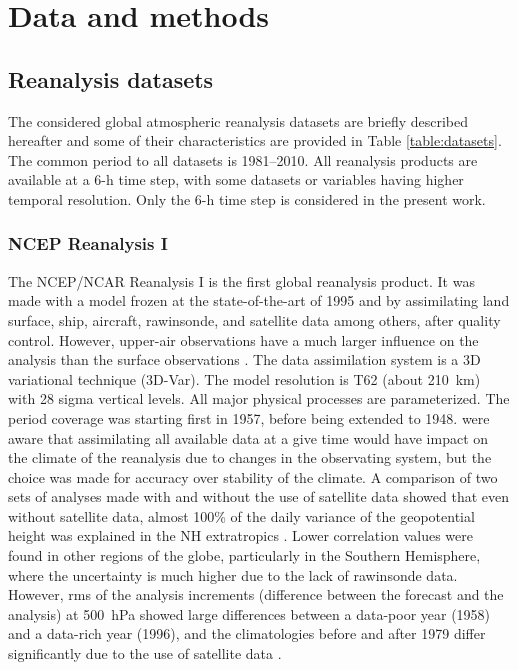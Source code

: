 \documentclass{ametsoc}
\begin{document}
\section{Data and methods}
\label{sec:data}

\subsection{Reanalysis datasets}

The considered global atmospheric reanalysis datasets are briefly described hereafter and some of their characteristics are provided in Table \ref{table:datasets}. The common period to all datasets is 1981--2010. All reanalysis products are available at a 6-h time step, with some datasets or variables having higher temporal resolution. Only the 6-h time step is considered in the present work.

\subsubsection{NCEP Reanalysis I}

The NCEP/NCAR Reanalysis I \citep[NR-1,][]{Kalnay1996, Kistler2001} is the first global reanalysis product. It was made with a model frozen at the state-of-the-art of 1995 and by assimilating land surface, ship, aircraft, rawinsonde, and satellite data among others, after quality control. However, upper-air observations have a much larger influence on the analysis than the surface observations \citep{Kistler2001}. The data assimilation system is a 3D variational technique (3D-Var). The model resolution is T62 (about 210~km) with 28 sigma vertical levels. All major physical processes are parameterized. The period coverage was starting first in 1957, before being extended to 1948. \citet{Kalnay1996} were aware that assimilating all available data at a give time would have impact on the climate of the reanalysis due to changes in the observating system, but the choice was made for accuracy over stability of the climate. A comparison of two sets of analyses made with and without the use of satellite data showed that even without satellite data, almost 100\% of the daily variance of the geopotential height was explained in the NH extratropics \citep{Kalnay1996}. Lower correlation values were found in other regions of the globe, particularly in the Southern Hemisphere, where the uncertainty is much higher due to the lack of rawinsonde data. However, rms of the analysis increments (difference between the forecast and the analysis) at 500~hPa showed large differences between a data-poor year (1958) and a data-rich year (1996), and the climatologies before and after 1979 differ significantly due to the use of satellite data \citep{Kistler2001}.
\end{document}
